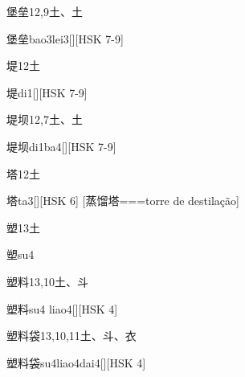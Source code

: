 \begin{Entry}{堡垒}{12,9}{⼟、⼟}
  \begin{Phonetics}{堡垒}{bao3lei3}[][HSK 7-9]
  \end{Phonetics}
\end{Entry}

\begin{Entry}{堤}{12}{⼟}
  \begin{Phonetics}{堤}{di1}[][HSK 7-9]
  \end{Phonetics}
\end{Entry}

\begin{Entry}{堤坝}{12,7}{⼟、⼟}
  \begin{Phonetics}{堤坝}{di1ba4}[][HSK 7-9]
  \end{Phonetics}
\end{Entry}

\begin{Entry}{塔}{12}{⼟}
  \begin{Phonetics}{塔}{ta3}[][HSK 6]
    [蒸馏塔===torre de destilação]
  \end{Phonetics}
\end{Entry}

\begin{Entry}{塑}{13}{⼟}
  \begin{Phonetics}{塑}{su4}
  \end{Phonetics}
\end{Entry}

\begin{Entry}{塑料}{13,10}{⼟、⽃}
  \begin{Phonetics}{塑料}{su4 liao4}[][HSK 4]
  \end{Phonetics}
\end{Entry}

\begin{Entry}{塑料袋}{13,10,11}{⼟、⽃、⾐}
  \begin{Phonetics}{塑料袋}{su4liao4dai4}[][HSK 4]
  \end{Phonetics}
\end{Entry}

